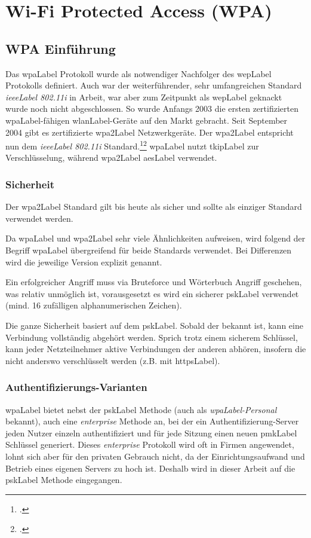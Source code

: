 \chapter{Wi-Fi Protected Access (WPA)}
\label{ch:wpa}


\section{WPA Einführung}
Das \gls{wpaLabel} Protokoll wurde als notwendiger Nachfolger des \gls{wepLabel} Protokolls definiert.
Auch war der weiterführender, sehr umfangreichen Standard \textit{\gls{ieeeLabel} 802.11i} in Arbeit, war aber zum Zeitpunkt als \gls{wepLabel} geknackt wurde noch nicht abgeschlossen. So wurde Anfangs 2003 die ersten zertifizierten \gls{wpaLabel}-fähigen \gls{wlanLabel}-Geräte auf den Markt gebracht.
Seit September 2004 gibt es zertifizierte \gls{wpa2Label} Netzwerkgeräte. Der \gls{wpa2Label} entspricht nun dem \textit{\gls{ieeeLabel} 802.11i} Standard.\footcite{Wi-Fi_Protected_Access__Wikipedia_2015-04-10}\footcite{WPA2__Wikipedia_2015-04-10}
\gls{wpaLabel} nutzt \gls{tkipLabel} zur Verschlüsselung, während \gls{wpa2Label} \gls{aesLabel} verwendet.

\subsection{Sicherheit}
Der \gls{wpa2Label} Standard gilt bis heute als sicher und sollte als einziger Standard verwendet werden.

Da \gls{wpaLabel} und \gls{wpa2Label} sehr viele Ähnlichkeiten aufweisen, wird folgend der Begriff \gls{wpaLabel} übergreifend für beide Standards verwendet. Bei Differenzen wird die jeweilige Version explizit genannt.

Ein erfolgreicher Angriff muss via Bruteforce und Wörterbuch Angriff geschehen, was relativ unmöglich ist, vorausgesetzt es wird ein sicherer \gls{pskLabel} verwendet (mind. 16 zufälligen alphanumerischen Zeichen).

Die ganze Sicherheit basiert auf dem \gls{pskLabel}.
Sobald der bekannt ist, kann eine Verbindung vollständig abgehört werden.
Sprich trotz einem sicherem Schlüssel, kann jeder Netzteilnehmer aktive Verbindungen der anderen abhören, insofern die nicht anderswo verschlüsselt werden (z.B. mit \gls{httpsLabel}).


\subsection{Authentifizierungs-Varianten}
\gls{wpaLabel} bietet nebst der \gls{pskLabel} Methode (auch als \textit{\gls{wpaLabel}-Personal} bekannt), auch eine \textit{enterprise} Methode an, bei der ein Authentifizierung-Server jeden Nutzer einzeln authentifiziert und für jede Sitzung einen neuen \gls{pmkLabel} Schlüssel generiert.
Dieses \textit{enterprise} Protokoll wird oft in Firmen angewendet, lohnt sich aber für den privaten Gebrauch nicht, da der Einrichtungsaufwand und Betrieb eines eigenen Servers zu hoch ist.
Deshalb wird in dieser Arbeit auf die \gls{pskLabel} Methode eingegangen.


